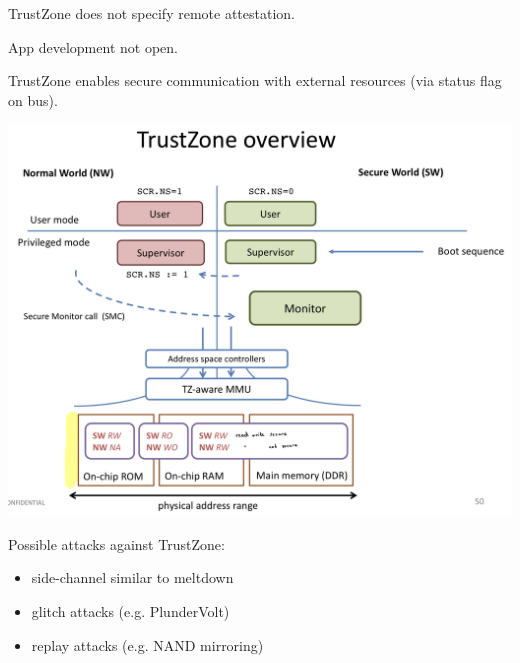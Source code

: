 TrustZone does not specify remote attestation.

App development not open.

TrustZone enables secure communication with external resources (via status flag on bus).

\begin{center}
    \includegraphics[width=0.8\linewidth]{images/mobile_sec_TrustZoneOverview.png}
\end{center}

Possible attacks against TrustZone: \vspace{-1.5mm}
\begin{itemize}
    \item side-channel similar to meltdown
    \item glitch attacks (e.g. PlunderVolt)
    \item replay attacks (e.g. NAND mirroring)
\end{itemize}